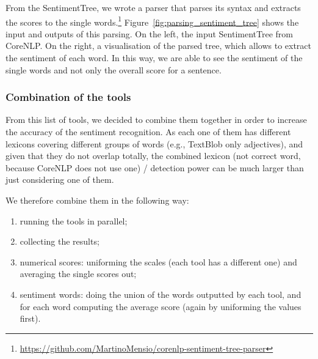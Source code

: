 From the SentimentTree, we wrote a parser that parses its syntax and extracts the scores to the single words.\footnote{\url{https://github.com/MartinoMensio/corenlp-sentiment-tree-parser}}
Figure~\ref{fig:parsing_sentiment_tree} shows the input and outputs of this parsing. On the left, the input SentimentTree from CoreNLP. On the right, a visualisation of the parsed tree, which allows to extract the sentiment of each word.
In this way, we are able to see the sentiment of the single words and not only the overall score for a sentence.

\subsubsection{\statusgreen Combination of the tools}

From this list of tools, we decided to combine them together in order to increase the accuracy of the sentiment recognition. %
As each one of them has different lexicons covering different groups of words (e.g., TextBlob only adjectives), and given that they do not overlap totally, the combined lexicon (not correct word, because CoreNLP does not use one) / detection power can be much larger than just considering one of them.

We therefore combine them in the following way:
\begin{enumerate}
    \item running the tools in parallel;
    \item collecting the results;
    \item numerical scores: uniforming the scales (each tool has a different one) and averaging the single scores out;
    \item sentiment words: doing the union of the words outputted by each tool, and for each word computing the average score (again by uniforming the values first).
\end{enumerate}

